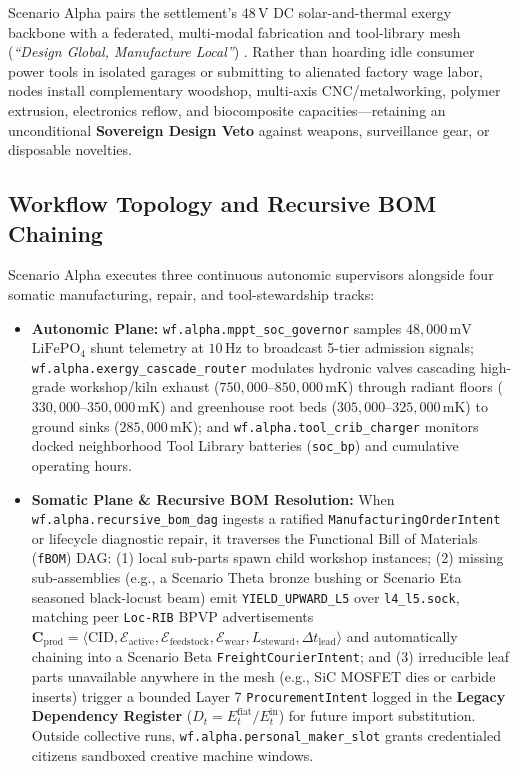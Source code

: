 Scenario Alpha pairs the settlement's $48\,\mathrm{V}$ DC solar-and-thermal exergy backbone
with a federated, multi-modal fabrication and tool-library mesh (\textit{``Design Global,
Manufacture Local''}) \parencite{ostrom2010,illich1973}. Rather than hoarding idle consumer
power tools in isolated garages or submitting to alienated factory wage labor, nodes
install complementary woodshop, multi-axis CNC/metalworking, polymer extrusion, electronics
reflow, and biocomposite capacities---retaining an unconditional \textbf{Sovereign Design
Veto} against weapons, surveillance gear, or disposable novelties.

\subsection{Workflow Topology and Recursive BOM Chaining}

Scenario Alpha executes three continuous autonomic supervisors alongside four somatic
manufacturing, repair, and tool-stewardship tracks:
\begin{itemize}
    \item \textbf{Autonomic Plane:} \texttt{wf.alpha.mppt\_soc\_governor} samples $48{,}000\,\mathrm{mV}$
    $\mathrm{LiFePO_4}$ shunt telemetry at $10\,\mathrm{Hz}$ to broadcast 5-tier admission
    signals; \texttt{wf.alpha.exergy\_cascade\_router} modulates hydronic valves cascading
    high-grade workshop/kiln exhaust ($750{,}000\text{--}850{,}000\,\mathrm{mK}$) through
    radiant floors ($330{,}000\text{--}350{,}000\,\mathrm{mK}$) and greenhouse root beds
    ($305{,}000\text{--}325{,}000\,\mathrm{mK}$) to ground sinks ($285{,}000\,\mathrm{mK}$);
    and \texttt{wf.alpha.tool\_crib\_charger} monitors docked neighborhood Tool Library
    batteries (\texttt{soc\_bp}) and cumulative operating hours.
    \item \textbf{Somatic Plane \& Recursive BOM Resolution:} When \texttt{wf.alpha.recursive\_bom\_dag}
    ingests a ratified \texttt{ManufacturingOrderIntent} or lifecycle diagnostic repair, it
    traverses the Functional Bill of Materials (\texttt{fBOM}) DAG: (1) local sub-parts
    spawn child workshop instances; (2) missing sub-assemblies (e.g., a Scenario Theta
    bronze bushing or Scenario Eta seasoned black-locust beam) emit \texttt{YIELD\_UPWARD\_L5}
    over \texttt{l4\_l5.sock}, matching peer \texttt{Loc-RIB} BPVP advertisements
    $\mathbf{C}_{\mathrm{prod}} = \langle \mathrm{CID}, \mathcal{E}_{\mathrm{active}}, \mathcal{E}_{\mathrm{feedstock}}, \mathcal{E}_{\mathrm{wear}}, L_{\mathrm{steward}}, \Delta t_{\mathrm{lead}} \rangle$
    and automatically chaining into a Scenario Beta \texttt{FreightCourierIntent}; and
    (3) irreducible leaf parts unavailable anywhere in the mesh (e.g., SiC MOSFET dies or
    carbide inserts) trigger a bounded Layer 7 \texttt{ProcurementIntent} logged in the
    \textbf{Legacy Dependency Register} ($D_t = E^{\mathrm{fiat}}_t / E^{\mathrm{in}}_t$)
    for future import substitution. Outside collective runs, \texttt{wf.alpha.personal\_maker\_slot}
    grants credentialed citizens sandboxed creative machine windows.
\end{itemize}

